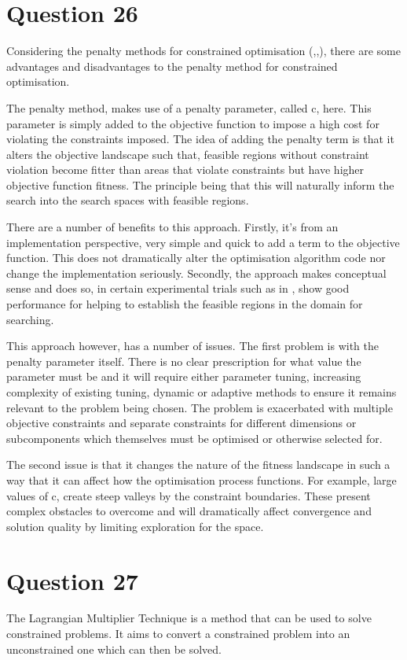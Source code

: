 \documentclass[12pt]{article}
\begin{document}
\section{Question 26}
Considering the penalty methods for constrained optimisation (\cite{Tandon2002595},\cite{Zhang01},\cite{Parsopoulos02particleswarm}), there are some advantages and disadvantages to the penalty method for constrained optimisation.

The penalty method, makes use of a penalty parameter, called c, here. This parameter is simply added to the objective function to impose a high cost for violating the constraints imposed. The idea of adding the penalty term is that it alters the objective landscape such that, feasible regions without constraint violation become fitter than areas that violate constraints but have higher objective function fitness. The principle being that this will naturally inform the search into the search spaces with feasible regions.

There are a number of benefits to this approach. Firstly, it's from an implementation perspective, very simple and quick to add a term to the objective function. This does not dramatically alter the optimisation algorithm code nor change the implementation seriously. Secondly, the approach makes conceptual sense and does so, in certain experimental trials such as in \cite{Parsopoulos02particleswarm}, show good performance for helping to establish the feasible regions in the domain for searching.

This approach however, has a number of issues. The first problem is with the penalty parameter itself. There is no clear prescription for what value the parameter must be and it will require either parameter tuning, increasing complexity of existing tuning, dynamic or adaptive methods to ensure it remains relevant to the problem being chosen. The problem is exacerbated with multiple objective constraints and separate constraints for different dimensions or subcomponents which themselves must be optimised or otherwise selected for. 

The second issue is that it changes the nature of the fitness landscape in such a way that it can affect how the optimisation process functions. For example, large values of c, create steep valleys by the constraint boundaries. These present complex obstacles to overcome and will dramatically affect convergence and solution quality by limiting exploration for the space.
\section{Question 27}
The Lagrangian Multiplier Technique \cite{NET:NET3230150112} is a method that can be used to solve constrained problems. It aims to convert a constrained problem into an unconstrained one which can then be solved.
\end{document}
